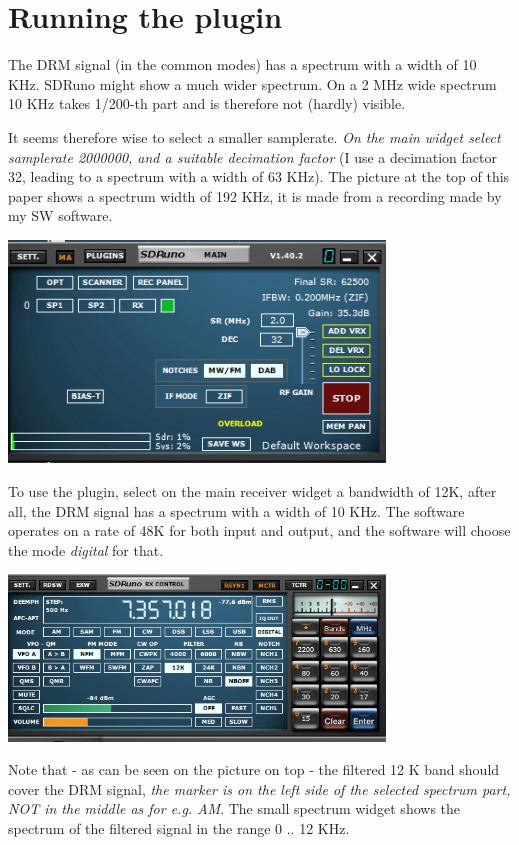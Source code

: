 \documentclass[10pt]{article}
\begin{document}
\section{Running the plugin}
The DRM signal (in the common modes)
has a spectrum with a width of 10 KHz. SDRuno might show
a much wider spectrum. On a 2 MHz wide spectrum 10 KHz takes 1/200-th part
and is therefore not (hardly) visible.

It seems therefore wise to select a smaller samplerate.
{\em On the main widget select samplerate 2000000, and a suitable
decimation factor} (I use a decimation factor 32, leading to a
spectrum with a width of 63 KHz).
The picture at the top of this paper shows a spectrum width of 192 KHz,
it is made from a recording made by my SW software.

\includegraphics[width=100mm]{drm-main-widget.png}

To use the plugin, select on the main receiver widget a bandwidth of 12K,
after all, the  DRM signal has a spectrum with a width of 10 KHz.
The software operates on a rate of 48K for both input and output,
and the software will choose the mode {\em digital} for that.

\includegraphics[width=100mm]{drm-receiver-widget.png}

Note that - as can be seen on the picture on top - the filtered 12 K
band should cover the DRM signal, {\em the marker is on the left side
of the selected spectrum part, NOT in the middle as for  e.g. AM}.
The small spectrum widget shows the spectrum of the filtered signal in the
range 0 .. 12 KHz.
\end{document}
